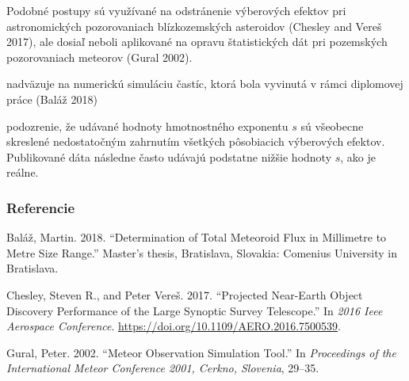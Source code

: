 Podobné postupy sú využívané na odstránenie výberových efektov pri
astronomických pozorovaniach blízkozemských asteroidov (Chesley and
Vereš 2017), ale dosiaľ neboli aplikované na opravu štatistických dát
pri pozemských pozorovaniach meteorov (Gural 2002).

nadväzuje na numerickú simuláciu častíc, ktorá bola vyvinutá v rámci
diplomovej práce (Baláž 2018)

podozrenie, že udávané hodnoty hmotnostného exponentu \(s\) sú všeobecne
skreslené nedostatočným zahrnutím všetkých pôsobiacich výberových
efektov. Publikované dáta následne často udávajú podstatne nižšie
hodnoty \(s\), ako je reálne.

\subsubsection*{Referencie}\label{referencie}

\hypertarget{refs}{}
\hypertarget{ref-balaz2018}{}
Baláž, Martin. 2018. ``Determination of Total Meteoroid Flux in
Millimetre to Metre Size Range.'' Master's thesis, Bratislava, Slovakia:
Comenius University in Bratislava.

\hypertarget{ref-chesley2017}{}
Chesley, Steven R., and Peter Vereš. 2017. ``Projected Near-Earth Object
Discovery Performance of the Large Synoptic Survey Telescope.'' In
\emph{2016 Ieee Aerospace Conference}.
\url{https://doi.org/10.1109/AERO.2016.7500539}.

\hypertarget{ref-gural2002}{}
Gural, Peter. 2002. ``Meteor Observation Simulation Tool.'' In
\emph{Proceedings of the International Meteor Conference 2001, Cerkno,
Slovenia}, 29--35.
